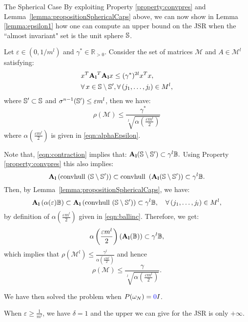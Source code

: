 \begin{subsection}{The Spherical Case}
By exploiting Property \ref{property:convpres} and Lemma~\ref{lemma:propositionSphericalCaps} above, we can now show in Lemma \ref{lemma:epsilon1} how one can compute an upper bound on the JSR when the ``almost invariant" set is the unit sphere $\mathbb{S}$.

\begin{prop}\label{lemma:epsilon1}
Let $\varepsilon \in (0, 1/m^l)$ and $\gamma^{*} \in \mathbb{R}_{> 0}$. Consider the set of matrices $\mathcal{M}$ and $A \in \mathcal{M}^l$ satisfying:
\begin{equation}\label{eqn:contraction}
\begin{aligned}
&x^T \mathbf{A_l}^T \mathbf{A_l} x \leq (\gamma^{*})^{2l} x^Tx, \\
& \forall\, x \in \mathbb{S} \setminus \mathbb{S}', \forall\,(j_1, \dots, j_l) \in M^l,
\end{aligned}
\end{equation}
where $\mathbb{S}' \subset \mathbb{S}$ and $\sigma^{n-1}(\mathbb{S}') \leq \varepsilon m^l$, then we have:
\begin{equation*}
\rho(\mathcal{M}) \leq \frac{\gamma^{*}}{\sqrt[l]{\alpha(\frac{\varepsilon m^l}{2})}}
\end{equation*}
where $\alpha(\frac{\varepsilon m^l}{2})$ is given in \eqref{eqn:alphaEpsilon}.
\end{prop}


\begin{pf}
Note that, \eqref{eqn:contraction} implies that:
$\mathbf{A_l} (\mathbb{S} \setminus \mathbb{S}') \subset \gamma^l \mathbb{B}.$
Using Property \ref{property:convpres} this also implies:
$$\mathbf{A_l} \left( \mbox{convhull }(\mathbb{S} \setminus \mathbb{S}') \right) \subset \mbox{convhull } \left( \mathbf{A_l}(\mathbb{S} \setminus \mathbb{S}') \right) \subset \gamma^l \mathbb{B} .$$
Then, by Lemma~\ref{lemma:propositionSphericalCaps}, we have:
$$\mathbf{A_l} \left( \alpha(\varepsilon) \mathbb{B} \right) \subset \mathbf{A_l} \left( \mbox{convhull } (\mathbb{S} \setminus \mathbb{S}') \right) \subset \gamma^l\mathbb{B}, \quad  \forall\, (j_1, \dots, j_l) \in M^l,$$
by definition of $\alpha(\frac{\varepsilon m^l}{2})$ given in \eqref{eqn:ballinc}. Therefore, we get:
$$\alpha \left( \frac{\varepsilon m^l}{2} \right) \left( \mathbf{A_l} (\mathbb{B}) \right) \subset \gamma^l\mathbb{B},$$
which implies that $\rho(\mathcal{M}^l) \leq \frac{\gamma^l}{\alpha(\frac{\varepsilon m^l}{2})}$ and hence $$\rho(\mathcal{M}) \leq \frac{\gamma}{\sqrt[l]{\alpha(\frac{\varepsilon m^l}{2})}}.$$
\end{pf}

We have then solved the problem when $P(\omega_N) = \ayca{I}$.

\begin{rem}
When $\varepsilon \geq \frac{1}{m^l}$, we have $\delta = 1$  and the upper we can give for the JSR is only $+ \infty$.
\end{rem}

\end{subsection}


